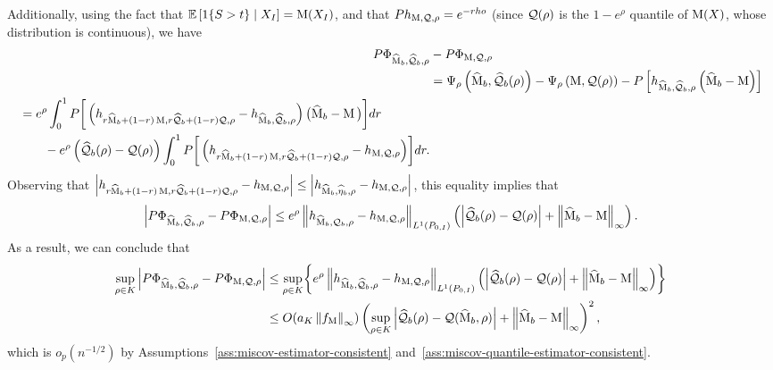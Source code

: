 Additionally,  using the fact that $\mathbb{E} \left[ 1\!\left\{S > t\right\} \mid X_I \right] = \operatorname*{M}(X_I)$,  and that $P h_{\operatorname*{M}, \mathcal{Q}, \rho} = e^{-rho}$ (since $\mathcal{Q}(\rho)$ is the $1-e^{\rho}$ quantile of $\operatorname*{M}(X)$,  whose distribution is continuous), we have
\begin{align*}
P \Phi_{\widehat{\operatorname*{M}}_b, \widehat{\mathcal{Q}}_b, \rho} &- P\Phi_{\operatorname*{M},  \mathcal{Q}, \rho} \\
&= \Psi_\rho \left( \widehat{\operatorname*{M}}_b, \widehat{\mathcal{Q}}_b(\rho) \right) - \Psi_\rho \left( \operatorname*{M},  \mathcal{Q}(\rho) \right) - P \left[ h_{\widehat{\operatorname*{M}}_b,  \widehat{\mathcal{Q}}_b, \rho}\left( \widehat{\operatorname*{M}}_b - \operatorname*{M} \right) \right] 
\\
\begin{split}
 &= e^\rho \int_{0}^1 P\biggr[ \left( h_{r \widehat{\operatorname*{M}}_b + (1-r) \operatorname*{M},  r \widehat{\mathcal{Q}}_b + (1-r) \mathcal{Q}, \rho} -  h_{\widehat{\operatorname*{M}}_b,  \widehat{\mathcal{Q}}_b, \rho} \right) \big(\widehat{\operatorname*{M}}_b - \operatorname*{M} \big) \biggr] dr \\
 & \qquad - e^\rho \left(\widehat{\mathcal{Q}}_b(\rho) - \mathcal{Q}(\rho)\right) \int_{0}^1  P\biggr[ \left( h_{r \widehat{\operatorname*{M}}_b + (1-r) \operatorname*{M},  r \widehat{\mathcal{Q}}_b + (1-r) \mathcal{Q}, \rho} - h_{\operatorname*{M}, \mathcal{Q}, \rho} \right) \biggr] dr.
 \end{split}
\end{align*}
Observing that $\left|h_{r \widehat{\operatorname*{M}}_b + (1-r) \operatorname*{M},  r \widehat{\mathcal{Q}}_b + (1-r) \mathcal{Q}, \rho} - h_{\operatorname*{M}, \mathcal{Q}, \rho}\right| \le \left| h_{\widehat{\operatorname*{M}}_b, \widehat{\eta}_b, \rho} - h_{\operatorname*{M}, \mathcal{Q}, \rho}\right|$, this equality implies that
\begin{align*}
\left| P \Phi_{\widehat{\operatorname*{M}}_b, \widehat{\mathcal{Q}}_b, \rho} - P\Phi_{\operatorname*{M},  \mathcal{Q}, \rho} \right| 
\le  e^\rho \left\|{h_{ \widehat{\operatorname*{M}}_b,  \mathcal{Q}_b, \rho} - h_{\operatorname*{M},  \mathcal{Q}, \rho}}\right\|_{L^1(P_{0,I})} \left( \left| \widehat{\mathcal{Q}}_b(\rho)  - \mathcal{Q}(\rho) \right| + \left\|{\widehat{\operatorname*{M}}_b - \operatorname*{M}}\right\|_{\infty} \right).
\end{align*}
As a result, we can conclude that
\begin{align*}
\sup_{\rho \in K} \left|P \Phi_{\widehat{\operatorname*{M}}_b, \widehat{\mathcal{Q}}_b, \rho} - P\Phi_{\operatorname*{M},  \mathcal{Q}, \rho} \right| &\le \sup_{\rho \in K} \biggr\{ e^\rho \left\|{h_{ \widehat{\operatorname*{M}}_b, \widehat{\mathcal{Q}}_b, \rho} - h_{\operatorname*{M},  \mathcal{Q}, \rho}}\right\|_{L^1(P_{0,I})} \left( \left| \widehat{\mathcal{Q}}_b(\rho)  - \mathcal{Q}(\rho) \right| + \left\|{\widehat{\operatorname*{M}}_b - \operatorname*{M}}\right\|_{\infty} \right) \biggr\}  \\
&\le O(a_K \left\|{f_{\operatorname*{M}}}\right\|_\infty) \left( \sup_{\rho \in K} \left| \widehat{\mathcal{Q}}_b(\rho)  - \mathcal{Q}(\widehat{\operatorname*{M}}_b, \rho) \right| + \left\|{\widehat{\operatorname*{M}}_b - \operatorname*{M}}\right\|_{\infty} \right)^2,
\end{align*}
which is $o_p(n^{-1/2})$ by Assumptions~\ref{ass:miscov-estimator-consistent} and~\ref{ass:miscov-quantile-estimator-consistent}.
